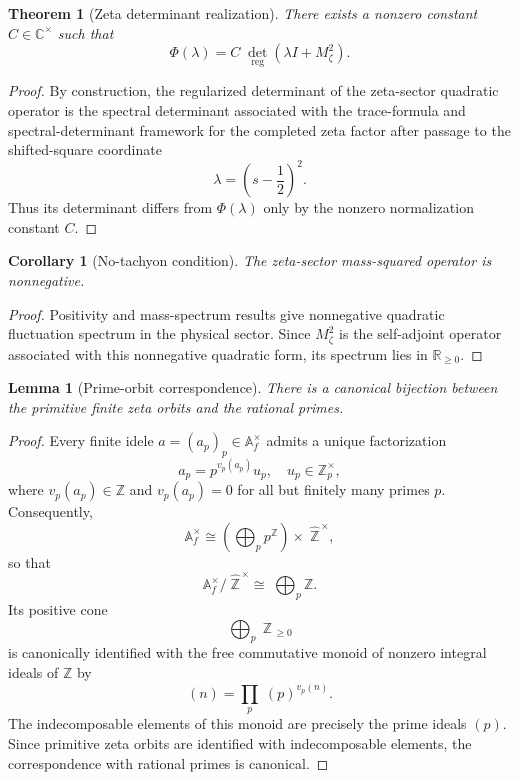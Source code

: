 \documentclass[pdflatex,sn-mathphys-num]{sn-jnl}
\theoremstyle{thmstyleone}
\newtheorem{theorem}{Theorem}
\newtheorem{lemma}{Lemma}
\newtheorem{corollary}{Corollary}
\theoremstyle{thmstyletwo}
\theoremstyle{thmstylethree}
\begin{document}
  \begin{theorem}[Zeta determinant realization]
  There exists a nonzero constant \(C\in\mathbb C^\times\) such that
  \[
    \Phi(\lambda)
    =
    C \; \det_{\mathrm{reg}}\left(\lambda I+M_\zeta^2\right).
  \]
  \end{theorem}

  \begin{proof}
  By construction, the regularized determinant of the zeta-sector quadratic
  operator is the spectral determinant associated with the
  trace-formula and spectral-determinant framework \cite{Connes1999,BerryKeating1999} for the
  completed zeta factor after passage to the shifted-square coordinate
  \[
    \lambda=\left(s-\frac12\right)^2.
  \]
  Thus its determinant differs from \(\Phi(\lambda)\) only by the nonzero
  normalization constant \(C\).
  \end{proof}

  \begin{corollary}[No-tachyon condition]
  The zeta-sector mass-squared operator is nonnegative.
  \end{corollary}

  \begin{proof}
  Positivity and mass-spectrum results \cite{BelnaUCFT2025} give nonnegative
  quadratic fluctuation spectrum in the physical sector. Since \(M_\zeta^2\)
  is the self-adjoint operator associated with this nonnegative quadratic form,
  its spectrum lies in $\mathbb{R}_{\ge0}$.
  \end{proof}

  \begin{lemma}[Prime-orbit correspondence]\label{lem:prime-orbit-correspondence}
  There is a canonical bijection between the primitive finite zeta orbits and
  the rational primes.
  \end{lemma}

  \begin{proof}
  Every finite idele $a=(a_p)_p\in\mathbb A_f^\times$
  admits a unique factorization \cite{Tate1967}
  \[
  a_p=p^{v_p(a_p)}u_p,
  \quad
  u_p\in\mathbb Z_p^\times,
  \]
  where \(v_p(a_p)\in\mathbb Z\) and \(v_p(a_p)=0\) for all but finitely many
  primes \(p\). Consequently,
  \[
  \mathbb A_f^\times
  \cong
  \left(\bigoplus_p p^{\mathbb Z}\right)
  \times\;
  \widehat{\mathbb Z}^{\,\times},
  \]
  so that
  \[
  \mathbb A_f^\times / \; \widehat {\mathbb Z}^{\,\times}
  \cong\;
  \bigoplus_p\mathbb Z.
  \]
  Its positive cone
  \[
  \bigoplus_p \; \mathbb Z_{\,\ge0}
  \]
  is canonically identified with the free commutative monoid of nonzero integral ideals of
  \(\mathbb Z\) by
  \[
  (n)=\prod_p \; (p)^{v_p(n)}.
  \]
  The indecomposable elements of this monoid are precisely the prime ideals \((p)\). Since primitive zeta orbits are identified with indecomposable elements, the correspondence with rational primes is canonical.
  \end{proof}
\end{document}
